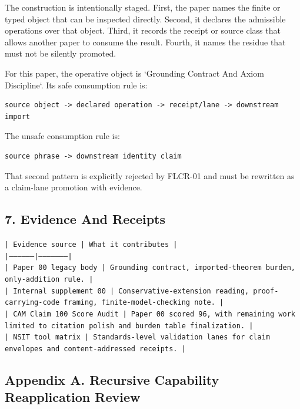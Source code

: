 \documentclass[11pt]{article}
\begin{document}
The construction is intentionally staged. First, the paper names the finite or
typed object that can be inspected directly. Second, it declares the admissible
operations over that object. Third, it records the receipt or source class that
allows another paper to consume the result. Fourth, it names the residue that
must not be silently promoted.

For this paper, the operative object is `Grounding Contract And Axiom Discipline`. Its safe consumption
rule is:

\begin{verbatim}
source object -> declared operation -> receipt/lane -> downstream import
\end{verbatim}

The unsafe consumption rule is:

\begin{verbatim}
source phrase -> downstream identity claim
\end{verbatim}

That second pattern is explicitly rejected by FLCR-01 and must be rewritten as
a claim-lane promotion with evidence.

\subsection*{7. Evidence And Receipts}

\noindent\texttt{| Evidence source | What it contributes |}\\
\noindent\texttt{|-----------------|---------------------|}\\
\noindent\texttt{| Paper 00 legacy body | Grounding contract, imported-theorem burden, only-addition rule. |}\\
\noindent\texttt{| Internal supplement 00 | Conservative-extension reading, proof-carrying-code framing, finite-model-checking note. |}\\
\noindent\texttt{| CAM Claim 100 Score Audit | Paper 00 scored 96, with remaining work limited to citation polish and burden table finalization. |}\\
\noindent\texttt{| NSIT tool matrix | Standards-level validation lanes for claim envelopes and content-addressed receipts. |}\\

\subsection*{Appendix A. Recursive Capability Reapplication Review}
\end{document}
